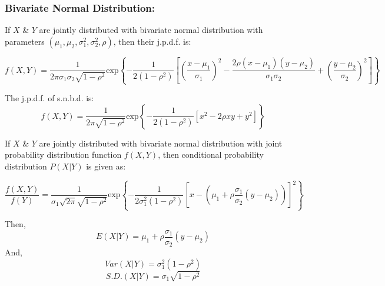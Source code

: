 \documentclass[
10pt, %
a4paper, %
]{report}
\begin{document}
\subsubsection*{Bivariate Normal Distribution:}
If \(X\) \& \(Y\) are jointly distributed with bivariate normal distribution with parameters \((\mu_1, \mu_2, \sigma_1^2, \sigma_2^2, \rho)\), then their j.p.d.f. is:

\[
f(X, Y) = \frac{1}{2\pi\sigma_1\sigma_2\sqrt{1-\rho^2}} \text{exp} \left\{ -\frac{1}{2(1-\rho^2)} \left[ \left( \frac{x-\mu_1}{\sigma_1} \right)^2 - \frac{2\rho(x-\mu_1)(y-\mu_2)}{\sigma_1\sigma_2} + \left( \frac{y-\mu_2}{\sigma_2} \right)^2 \right]\right\}
\]

The j.p.d.f. of s.n.b.d. is:
\[
f(X, Y) = \frac{1}{2\pi\sqrt{1-\rho^2}} \text{exp} \left\{ -\frac{1}{2(1-\rho^2)} \left[ x^2 - 2\rho x y + y^2 \right]\right\}
\]

If \(X\) \& \(Y\) are jointly distributed with bivariate normal distribution with joint probability distribution function \(f(X, Y)\), then conditional probability distribution \(P(X|Y)\) is given as:

\[
\frac{f(X, Y)}{f(Y)} = \frac{1}{\sigma_1 \sqrt{2\pi} \sqrt{1-\rho^2}} \text{exp} \left\{ -\frac{1}{2\sigma_1^2(1-\rho^2)} \left[ x - \left( \mu_1 + \rho \frac{\sigma_1}{\sigma_2} (y-\mu_2) \right) \right]^2 \right\}
\]

Then, 
\[
E(X|Y) = \mu_1 + \rho \frac{\sigma_1}{\sigma_2} (y-\mu_2) 
\]
And,
\[
Var(X|Y) = \sigma_1^2 (1-\rho^2)
\]
\[
S.D.(X|Y) = \sigma_1 \sqrt{1-\rho^2}
\]




\end{document}

